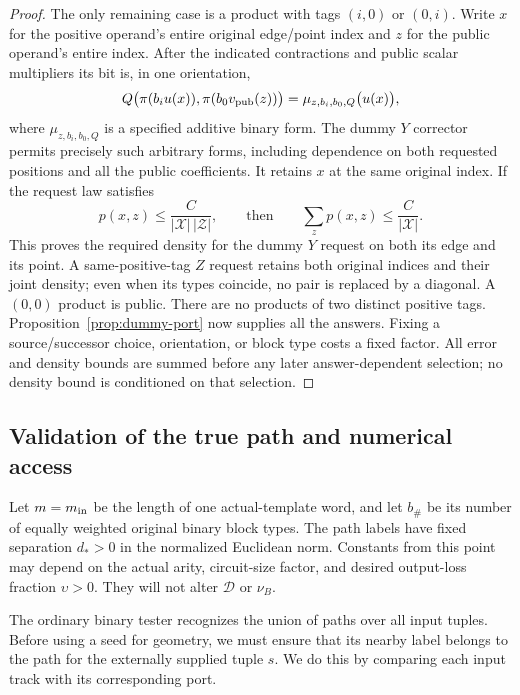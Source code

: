 \begin{proof}
The only remaining case is a product with tags $(i,0)$ or $(0,i)$.
Write $x$ for the positive operand's entire original edge/point index and
$z$ for the public operand's entire index. After the indicated contractions
and public scalar multipliers its bit is, in one orientation,
\begin{equation}\label{ig:mixed-form}
 Q\bigl(\pi(b_i u(x)),\pi(b_0 v_{\rm pub}(z))\bigr)
       =\mu_{z,b_i,b_0,Q}\bigl(u(x)\bigr),
\end{equation}
where $\mu_{z,b_i,b_0,Q}$ is a specified additive binary form. The dummy
$Y$ corrector permits precisely such arbitrary forms, including dependence
on both requested positions and all the public coefficients. It retains
$x$ at the same original index. If the request law satisfies
\[
 p(x,z)\le\frac{C}{|\mathcal X|\,|\mathcal Z|},
 \qquad\text{then}\qquad
 \sum_zp(x,z)\le\frac{C}{|\mathcal X|}.
\]
This proves the required density for the dummy $Y$ request on both its
edge and its point. A same-positive-tag $Z$ request retains both original
indices and their joint density; even when its types coincide, no pair
is replaced by a diagonal. A $(0,0)$ product is public. There are no
products of two distinct positive tags. Proposition~\ref{prop:dummy-port}
now supplies all the answers. Fixing a source/successor choice, orientation,
or block type costs a fixed factor. All error and density bounds are
summed before any later answer-dependent selection; no density bound is
conditioned on that selection.
\end{proof}

\subsection{Validation of the true path and numerical access}

Let $m=m_{\rm in}$ be the length of one actual-template word, and let
$b_\#$ be its number of equally weighted original binary block types.
The path labels have fixed separation $d_*>0$ in the normalized Euclidean
norm. Constants from this point may depend on the actual arity,
circuit-size factor, and desired output-loss fraction $\upsilon>0$.
They will not alter $\mathcal D$ or $\nu_B$.

The ordinary binary tester recognizes the union of paths over all input
tuples. Before using a seed for geometry, we must ensure that its nearby
label belongs to the path for the externally supplied tuple $s$.
We do this by comparing each input track with its corresponding port.

